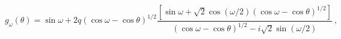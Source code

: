 \begin{equation}
g_\omega(\theta)=\sin\omega+2q(\cos\omega-\cos\theta)^{1/2}\frac{[\sin\omega+
\sqrt2\cos(\omega/2)(\cos\omega-\cos\theta)^{1/2}]}{(\cos\omega-
\cos\theta)^{1/2}-i\sqrt2\sin(\omega/2)} \ ,
\end{equation}

